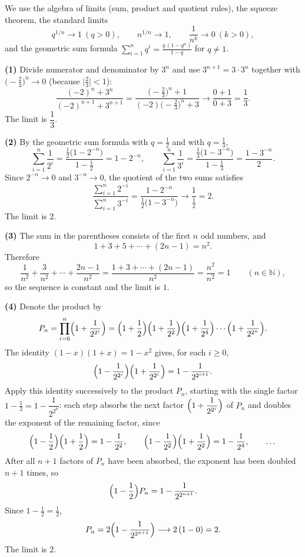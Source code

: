 \documentclass[11pt,a4paper]{article}
\newenvironment{solution}[1]{%
  \par\addvspace{1.7ex}%
  \noindent{\color{solutioncolor}\textbf{#1}}\hspace{0.55em}\ignorespaces}%
  {\par\addvspace{0.9ex}}
\begin{document}
\begin{solution}{Solution 2.1.4}\label{xs:2.1.4}
We use the algebra of limits (sum, product and quotient rules), the squeeze
theorem, the standard limits
\[
  q^{1/n}\to1\ (q>0),\qquad n^{1/n}\to1,\qquad \frac1{n^{k}}\to0\ (k>0),
\]
and the geometric sum formula
$\displaystyle\sum_{i=1}^{n}q^{i}=\frac{q\,(1-q^{n})}{1-q}$ for $q\ne1$.

\medskip
\noindent\textbf{(1)} Divide numerator and denominator by $3^{n}$ and use
$3^{n+1}=3\cdot3^{n}$ together with $\bigl(-\tfrac23\bigr)^{n}\to0$ (because
$\bigl|\tfrac23\bigr|<1$):
\[
  \frac{(-2)^{n}+3^{n}}{(-2)^{n+1}+3^{n+1}}
  =\frac{\bigl(-\tfrac23\bigr)^{n}+1}{(-2)\bigl(-\tfrac23\bigr)^{n}+3}
  \longrightarrow\frac{0+1}{0+3}=\frac13 .
\]
The limit is $\boxed{\dfrac13}$.

\medskip
\noindent\textbf{(2)} By the geometric sum formula with $q=\tfrac12$ and with
$q=\tfrac13$,
\[
  \sum_{i=1}^{n}\frac{1}{2^{i}}
  =\frac{\tfrac12\bigl(1-2^{-n}\bigr)}{1-\tfrac12}=1-2^{-n},
  \qquad
  \sum_{i=1}^{n}\frac{1}{3^{i}}
  =\frac{\tfrac13\bigl(1-3^{-n}\bigr)}{1-\tfrac13}
  =\frac{1-3^{-n}}{2} .
\]
Since $2^{-n}\to0$ and $3^{-n}\to0$, the quotient of the two sums satisfies
\[
  \frac{\displaystyle\sum_{i=1}^{n}2^{-i}}{\displaystyle\sum_{i=1}^{n}3^{-i}}
  =\frac{1-2^{-n}}{\tfrac12\bigl(1-3^{-n}\bigr)}
  \longrightarrow\frac{1}{\tfrac12}=2 .
\]
The limit is $\boxed{2}$.

\medskip
\noindent\textbf{(3)} The sum in the parentheses consists of the first $n$ odd
numbers, and
\[
  1+3+5+\cdots+(2n-1)=n^{2} .
\]
Therefore
\[
  \frac{1}{n^{2}}+\frac{3}{n^{2}}+\cdots+\frac{2n-1}{n^{2}}
  =\frac{1+3+\cdots+(2n-1)}{n^{2}}=\frac{n^{2}}{n^{2}}=1
  \qquad(n\in\mathbb{N}),
\]
so the sequence is constant and the limit is $\boxed{1}$.

\medskip
\noindent\textbf{(4)} Denote the product by
\[
  P_n=\prod_{i=0}^{n}\Bigl(1+\frac{1}{2^{2^{i}}}\Bigr)
  =\Bigl(1+\frac12\Bigr)\Bigl(1+\frac{1}{2^{2}}\Bigr)
   \Bigl(1+\frac{1}{2^{4}}\Bigr)\cdots\Bigl(1+\frac{1}{2^{2^{n}}}\Bigr).
\]
The identity $(1-x)(1+x)=1-x^{2}$ gives, for each $i\ge0$,
\[
  \Bigl(1-\frac{1}{2^{2^{i}}}\Bigr)\Bigl(1+\frac{1}{2^{2^{i}}}\Bigr)
  =1-\frac{1}{2^{2^{i+1}}} .
\]
Apply this identity successively to the product $P_n$, starting with the single
factor $1-\tfrac12=1-\dfrac{1}{2^{2^{0}}}$: each step absorbs the next factor
$\Bigl(1+\dfrac{1}{2^{2^{i}}}\Bigr)$ of $P_n$ and doubles the exponent of the
remaining factor, since
\[
  \Bigl(1-\frac12\Bigr)\Bigl(1+\frac12\Bigr)=1-\frac{1}{2^{2}},\qquad
  \Bigl(1-\frac{1}{2^{2}}\Bigr)\Bigl(1+\frac{1}{2^{2}}\Bigr)=1-\frac{1}{2^{4}},
  \qquad\dots
\]
After all $n+1$ factors of $P_n$ have been absorbed, the exponent has been
doubled $n+1$ times, so
\[
  \Bigl(1-\frac12\Bigr)P_n=1-\frac{1}{2^{2^{n+1}}} .
\]
Since $1-\tfrac12=\tfrac12$,
\[
  P_n=2\Bigl(1-\frac{1}{2^{2^{n+1}}}\Bigr)
  \longrightarrow 2\,(1-0)=2 .
\]
The limit is $\boxed{2}$.


\end{solution}
\end{document}
